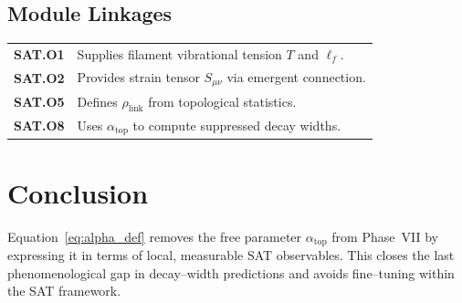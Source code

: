 \documentclass[12pt]{article}
\begin{document}
\subsection*{Module Linkages}
\begin{center}
\begin{tabular}{ll}
\textbf{SAT.O1} & Supplies filament vibrational tension $T$ and $\ell_f$.\\
\textbf{SAT.O2} & Provides strain tensor $S_{\mu\nu}$ via emergent connection.\\
\textbf{SAT.O5} & Defines $\rho_{\text{link}}$ from topological statistics.\\
\textbf{SAT.O8} & Uses $\alpha_{\text{top}}$ to compute suppressed decay widths.\\
\end{tabular}
\end{center}

\section*{Conclusion}
Equation~\eqref{eq:alpha_def} removes the free parameter $\alpha_{\text{top}}$ from Phase~VII by expressing it in terms of local, measurable SAT observables. This closes the last phenomenological gap in decay--width predictions and avoids fine--tuning within the SAT framework.
\end{document}
